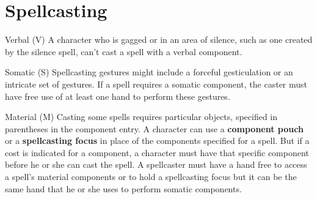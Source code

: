 \documentclass[a4paper,10pt,twoside,twocolumn]{dndbook} %
\begin{document}
	\section{Spellcasting} 
	\begin{DndSidebar}{Verbal (V)}
		A character who is gagged or in an area of silence, such as one created by the silence spell, can't cast a spell with a verbal component.
	\end{DndSidebar}
	\begin{DndSidebar}{Somatic (S)}
		Spellcasting gestures might include a forceful gesticulation or an intricate set of gestures. If a spell requires a somatic component, the caster must have free use of at least one hand to perform these gestures.
	\end{DndSidebar}
	\begin{DndSidebar}{Material (M)}
		Casting some spells requires particular objects, specified in parentheses in the component entry. A character can use a \textbf{component pouch} or a \textbf{spellcasting focus} in place of the components specified for a spell. But if a cost is indicated for a component, a character must have that specific component before he or she can cast the spell.
		A spellcaster must have a hand free to access a spell's material components or to hold a spellcasting focus but it can be the same hand that he or she uses to perform somatic components. 
	\end{DndSidebar}

\end{document}
